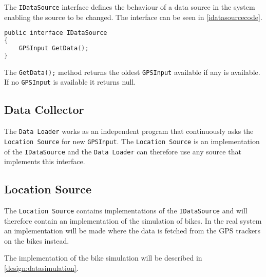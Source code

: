 The \lstinline!IDataSource! interface defines the behaviour of a data source in the system enabling the source to be changed.
The interface can be seen in \cref{idatasourcecode}.

\begin{lstlisting}[language=C,caption=The IDataSource interface,label=idatasourcecode]
public interface IDataSource
{
	GPSInput GetData();
}
\end{lstlisting}

The \lstinline!GetData();! method returns the oldest \lstinline!GPSInput! available if any is available.
If no \lstinline!GPSInput! is available it returns null.

\subsection{Data Collector}
The \texttt{Data Loader} works as an independent program that continuously asks the \lstinline!Location Source! for new \lstinline!GPSInput!.
The \lstinline!Location Source! is an implementation of the \lstinline!IDataSource! and the \texttt{Data Loader} can therefore use any source that implements this interface.

\subsection{Location Source}\label{design:location_source}
The \texttt{Location Source} contains implementations of the \lstinline!IDataSource! and will therefore contain an implementation of the simulation of bikes.
In the real system an implementation will be made where the data is fetched from the GPS trackers on the bikes instead.

The implementation of the bike simulation will be described in \cref{design:datasimulation}.
 